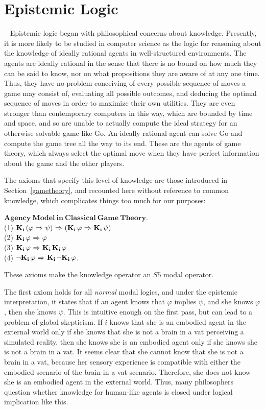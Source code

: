 \section{Epistemic Logic}~\label{epistemic_logic}
Epistemic logic began with philosophical concerns about knowledge. Presently, it is more likely to be studied in computer science as the logic for reasoning about the knowledge of ideally rational agents in well-structured environments. The agents are ideally rational in the sense that there is no bound on how much they can be said to know, nor on what propositions they are aware of at any one time. Thus, they have no problem conceiving of every possible sequence of moves a game may consist of, evaluating all possible outcomes, and deducing the optimal sequence of moves in order to maximize their own utilities. They are even stronger than contemporary computers in this way, which are bounded by time and space, and so are unable to actually compute the ideal strategy for an otherwise solvable game like Go. An ideally rational agent can solve Go and compute the game tree all the way to its end. These are the agents of game theory, which always select the optimal move when they have perfect information about the game and the other players.

The axioms that specify this level of knowledge are those introduced in Section~\ref{gametheory}, and recounted here without reference to common knowledge, which complicates things too much for our purposes:

$\mathbf{Agency\  Model\  in\  Classical\  Game\  Theory}$.\\
(1) $\mathbf{K}_{\mathbf{i}}\,(\varphi {\ \Rightarrow \ } \psi) {\ \Rightarrow \ } (\mathbf{K}_{\mathbf{i}}\,\varphi {\ \Rightarrow \ } \mathbf{K}_{\mathbf{i}}\,\psi)$\\
(2) $\mathbf{K}_{\mathbf{i}}\,\varphi {\ \Rightarrow \ } \varphi$\\
(3) $\mathbf{K}_{\mathbf{i}}\,\varphi {\ \Rightarrow \ } \mathbf{K}_{\mathbf{i}}\,\mathbf{K}_{\mathbf{i}}\,\varphi$\\
(4) ${\neg} \mathbf{K}_{\mathbf{i}}\,\varphi {\ \Rightarrow \ } \mathbf{K}_{\mathbf{i}}\,{\neg}\mathbf{K}_{\mathbf{i}}\,\varphi$.

These axioms make the knowledge operator an $\mathit{S5}$ modal operator. 

The first axiom holds for all \emph{normal} modal logics, and under the epistemic interpretation, it states that if an agent knows that $\varphi$ implies $\psi$, and she knows $\varphi$, then she knows $\psi$. This is intuitive enough on the first pass, but can lead to a problem of global skepticism. If $i$ knows that she is an embodied agent in the external world only if she knows that she is not a brain in a vat perceiving a simulated reality, then she knows she is an embodied agent only if she knows she is not a brain in a vat. It seems clear that she cannot know that she is not a brain in a vat, because her sensory experience is compatible with either the embodied scenario of the brain in a vat scenario. Therefore, she does not know she is an embodied agent in the external world. Thus, many philosophers question whether knowledge for human-like agents is closed under logical implication like this.

